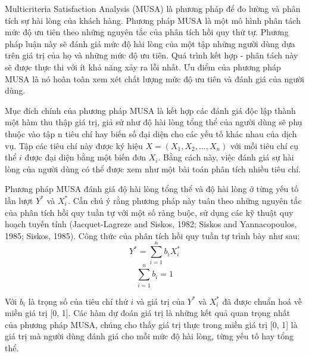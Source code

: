 \par
Multicriteria Satisfaction Analysis (MUSA) là phương pháp để đo lường và phân tích sự hài lòng của khách hàng. Phương pháp MUSA là một mô hình phân tách mức độ ưu tiên theo những nguyên tắc của phân tích hồi quy thứ tự. Phương pháp luận này sẽ đánh giá mức độ hài lòng của một tập những người dùng dựa trên giá trị của họ và những mức độ ưu tiên. Quá trình kết hợp - phân tách này sẽ được thực thi với ít khả năng xảy ra lỗi nhất. Ưu điểm của phương pháp MUSA là nó hoàn toàn xem xét chất lượng mức độ ưu tiên và đánh giá của người dùng.
\par
Mục đích chính của phương pháp MUSA là kết hợp các đánh giá độc lập thành một hàm thu thập giá trị, giả sử như độ hài lòng tổng thể của người dùng sẽ phụ thuộc vào tập n tiêu chí hay biến số đại diện cho các yếu tố khác nhau của dịch vụ. Tập các tiêu chí này được ký hiệu $X = (X_1, X_2,..., X_n)$ với mỗi tiêu chí cụ thể $i$ được đại diện bằng một biến đơn $X_i$. Bằng cách này, việc đánh giá sự hài lòng của người dùng có thể được xem như một bài toán phân tích nhiều tiêu chí.
\par
Phương pháp MUSA đánh giá độ hài lòng tổng thể và độ hài lòng ở từng yếu tố lần lượt $Y^*$ và $X_i^*$. Cần chú ý rằng phương pháp này tuân theo những nguyên tắc của phân tích hồi quy tuần tự với một số ràng buộc, sử dụng các kỹ thuật quy hoạch tuyến tính (Jacquet-Lagreze and Siskos, 1982; Siskos and Yannacopoulos, 1985; Siskos, 1985). Công thức của phân tích hồi quy tuần tự trình bày như sau:
\[ Y^* = \sum_{i=1}^{n} b_iX_i^*\]
\[ \sum_{i=1}^{n} b_i = 1\]
\par
Với $b_i$ là trọng số của tiêu chí thứ $i$ và giá trị của $Y^*$ và $X_i^*$ đã được chuẩn hoá về miền giá trị [0, 1].
Các hàm dự đoán giá trị là những kết quả quan trọng nhất của phương pháp MUSA, chúng cho thấy giá trị thực trong miền giá trị [0, 1] là giá trị mà người dùng đánh giá cho mỗi mức độ hài lòng, từng yếu tố hay tổng thể.

